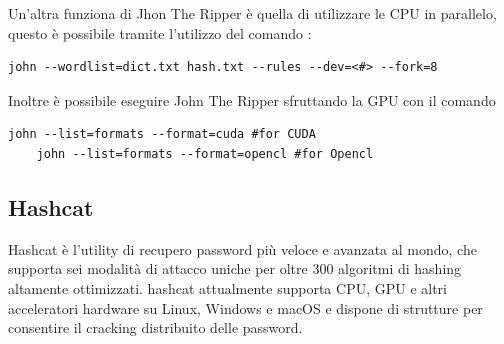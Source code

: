 Un'altra funziona di Jhon The Ripper è quella di utilizzare le CPU in parallelo, questo è possibile tramite l'utilizzo del comando :

\begin{lstlisting}[caption={John the ripper Multi-CPU example 8 core}, style=javaScriptCode]
    john --wordlist=dict.txt hash.txt --rules --dev=<#> --fork=8
\end{lstlisting}

Inoltre è possibile eseguire John The Ripper sfruttando la GPU con il comando 
\begin{lstlisting}[caption={John the ripper GPU example}, style=javaScriptCode]
    john --list=formats --format=cuda #for CUDA
    john --list=formats --format=opencl #for Opencl\end{lstlisting}
\subsection{Hashcat}

Hashcat è l'utility di recupero password più veloce e avanzata al mondo, che supporta sei modalità di attacco uniche per oltre 300 algoritmi di hashing altamente ottimizzati. hashcat attualmente supporta CPU, GPU e altri acceleratori hardware su Linux, Windows e macOS e dispone di strutture per consentire il cracking distribuito delle password.

